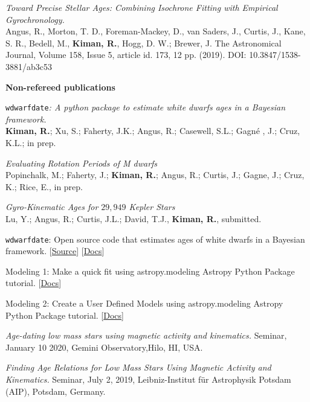 \documentclass[10pt]{cv}
\begin{document}
\begin{llist}
\textit{Toward Precise Stellar Ages: Combining Isochrone Fitting with Empirical Gyrochronology.}\\ 
Angus, R., Morton, T. D., Foreman-Mackey, D., van Saders, J., Curtis, J., Kane, S. R., Bedell, M., \textbf{Kiman, R.}, Hogg, D. W.; Brewer, J. The Astronomical Journal, Volume 158, Issue 5, article id. 173, 12 pp. (2019). DOI: 10.3847/1538-3881/ab3c53

\textbf{Non-refereed publications}

\texttt{wdwarfdate}\textit{: A python package to estimate white dwarfs ages in a Bayesian framework.}\\
\textbf{Kiman, R.}; Xu, S.; Faherty, J.K.; Angus, R.; Casewell, S.L.; Gagn\'e , J.; Cruz, K.L.; in prep. 

\textit{Evaluating Rotation Periods of M dwarfs}\\
Popinchalk, M.; Faherty, J.; \textbf{Kiman, R.}; Angus, R.; Curtis, J.; Gagne, J.; Cruz, K.; Rice, E., in prep.

\textit{Gyro-Kinematic Ages for $29,949$ Kepler Stars}\\
Lu, Y.; Angus, R.; Curtis, J.L.; David, T.J., \textbf{​Kiman, R.}​, submitted.


\texttt{wdwarfdate}: Open source code that estimates ages of white dwarfs in a Bayesian framework. [\href{https://github.com/rkiman/wdwarfdate}{Source}] [\href{https://wdwarfdate.readthedocs.io/en/latest/}{Docs}] 

Modeling 1: Make a quick fit using astropy.modeling
Astropy Python Package tutorial. [\href{http://learn.astropy.org/rst-tutorials/Models-Quick-Fit.html?highlight=filtertutorials}{Docs}]

Modeling 2: Create a User Defined Models using astropy.modeling
Astropy Python Package tutorial. [\href{http://learn.astropy.org/rst-tutorials/User-Defined-Model.html?highlight=filtertutorials}{Docs}] 


\textit{Age-dating low mass stars using magnetic activity and kinematics.} Seminar, January 10 2020, Gemini Observatory,Hilo, HI, USA.

\textit{Finding Age Relations for Low Mass Stars Using Magnetic Activity and Kinematics.} Seminar, July 2, 2019, Leibniz-Institut f\"{u}r Astrophysik Potsdam (AIP), Potsdam, Germany.


\end{llist}
\end{document}
